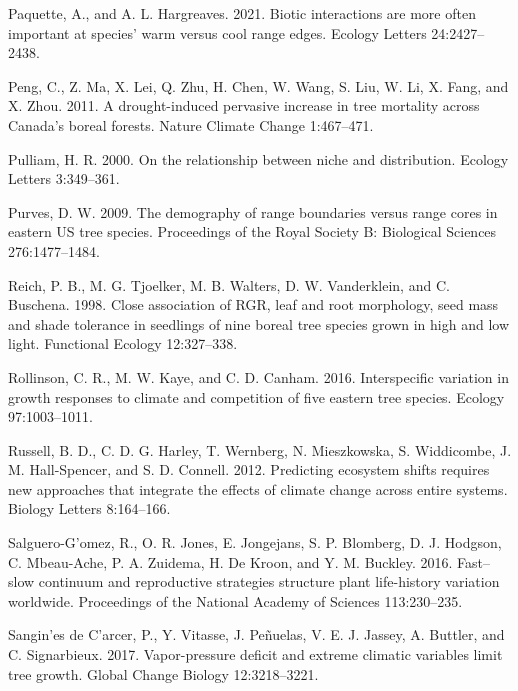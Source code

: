\documentclass[12pt]{article}
\newlength{\cslhangindent}
\newenvironment{cslreferences}%
  {\setlength{\parindent}{0pt}%
  \everypar{\setlength{\hangindent}{\cslhangindent}}\ignorespaces}%
  {\par}
\begin{document}
\begin{cslreferences}
\leavevmode\hypertarget{ref-Paquette2021}{}%
Paquette, A., and A. L. Hargreaves. 2021. Biotic interactions are more
often important at species' warm versus cool range edges. Ecology
Letters 24:2427--2438.

\leavevmode\hypertarget{ref-Peng2011}{}%
Peng, C., Z. Ma, X. Lei, Q. Zhu, H. Chen, W. Wang, S. Liu, W. Li, X.
Fang, and X. Zhou. 2011. A drought-induced pervasive increase in tree
mortality across Canada's boreal forests. Nature Climate Change
1:467--471.

\leavevmode\hypertarget{ref-Pulliam2000}{}%
Pulliam, H. R. 2000. On the relationship between niche and distribution.
Ecology Letters 3:349--361.

\leavevmode\hypertarget{ref-Purves2009}{}%
Purves, D. W. 2009. The demography of range boundaries versus range
cores in eastern US tree species. Proceedings of the Royal Society B:
Biological Sciences 276:1477--1484.

\leavevmode\hypertarget{ref-Reich1998}{}%
Reich, P. B., M. G. Tjoelker, M. B. Walters, D. W. Vanderklein, and C.
Buschena. 1998. Close association of RGR, leaf and root morphology, seed
mass and shade tolerance in seedlings of nine boreal tree species grown
in high and low light. Functional Ecology 12:327--338.

\leavevmode\hypertarget{ref-Rollinson2016}{}%
Rollinson, C. R., M. W. Kaye, and C. D. Canham. 2016. Interspecific
variation in growth responses to climate and competition of five eastern
tree species. Ecology 97:1003--1011.

\leavevmode\hypertarget{ref-Russell2012}{}%
Russell, B. D., C. D. G. Harley, T. Wernberg, N. Mieszkowska, S.
Widdicombe, J. M. Hall-Spencer, and S. D. Connell. 2012. Predicting
ecosystem shifts requires new approaches that integrate the effects of
climate change across entire systems. Biology Letters 8:164--166.

\leavevmode\hypertarget{ref-SalgueroGomez2016}{}%
Salguero-G\a'omez, R., O. R. Jones, E. Jongejans, S. P. Blomberg, D. J.
Hodgson, C. Mbeau-Ache, P. A. Zuidema, H. De Kroon, and Y. M. Buckley.
2016. Fast--slow continuum and reproductive strategies structure plant
life-history variation worldwide. Proceedings of the National Academy of
Sciences 113:230--235.

\leavevmode\hypertarget{ref-Sangines2017}{}%
Sangin\a'es de C\a'arcer, P., Y. Vitasse, J. Peñuelas, V. E. J. Jassey,
A. Buttler, and C. Signarbieux. 2017. Vapor-pressure deficit and extreme
climatic variables limit tree growth. Global Change Biology
12:3218--3221.


\end{cslreferences}
\end{document}
